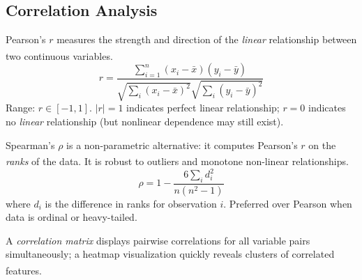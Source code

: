 \subsection{Correlation Analysis}

\begin{tcbitemize}[ skin=sectionraster ]
    \tcbitem[title=Pearson Correlation, raster multicolumn=3]
    Pearson's $r$ measures the strength and direction of the \emph{linear} relationship between two continuous variables\textsuperscript{\cite{brucePracticalStatisticsData2017}}.
    \begin{equation}
        r = \frac{\sum_{i=1}^n (x_i - \bar{x})(y_i - \bar{y})}{\sqrt{\sum_i (x_i-\bar{x})^2}\sqrt{\sum_i (y_i-\bar{y})^2}}
    \end{equation}
    Range: $r \in [-1, 1]$. $|r| = 1$ indicates perfect linear relationship; $r = 0$ indicates no \emph{linear} relationship (but nonlinear dependence may still exist).

    \tcbitem[title=Spearman Rank Correlation, raster multicolumn=3]
    Spearman's $\rho$ is a non-parametric alternative: it computes Pearson's $r$ on the \emph{ranks} of the data\textsuperscript{\cite{brucePracticalStatisticsData2017}}.
    It is robust to outliers and monotone non-linear relationships.
    \begin{equation}
        \rho = 1 - \frac{6\sum_i d_i^2}{n(n^2-1)}
    \end{equation}
    where $d_i$ is the difference in ranks for observation $i$.
    Preferred over Pearson when data is ordinal or heavy-tailed.

    \tcbitem[title={Correlation Matrix \& Correlation Is Not Causation}, raster multicolumn=6]
    A \emph{correlation matrix} displays pairwise correlations for all variable pairs simultaneously; a heatmap visualization quickly reveals clusters of correlated features\textsuperscript{\cite{brucePracticalStatisticsData2017}}.


\end{tcbitemize}
